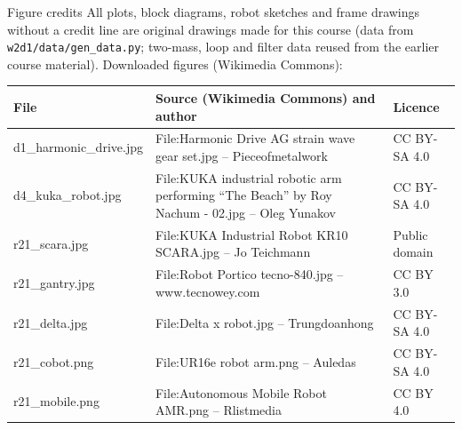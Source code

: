 \documentclass[aspectratio=169,10pt]{beamer}
\begin{document}
\begin{frame}[t]{Figure credits}
\scriptsize
All plots, block diagrams, robot sketches and frame drawings without a credit line are original drawings made for this course
(data from \texttt{w2d1/data/gen\_data.py}; two-mass, loop and filter data reused from the earlier course material). Downloaded figures (Wikimedia Commons):\\[2mm]
\begin{tabularx}{\linewidth}{@{}l X l@{}}
\toprule
\textbf{File} & \textbf{Source (Wikimedia Commons) and author} & \textbf{Licence}\\
\midrule
d1\_harmonic\_drive.jpg & File:Harmonic Drive AG strain wave gear set.jpg -- Pieceofmetalwork & CC BY-SA 4.0\\
d4\_kuka\_robot.jpg & File:KUKA industrial robotic arm performing ``The Beach'' by Roy Nachum - 02.jpg -- Oleg Yunakov & CC BY-SA 4.0\\
r21\_scara.jpg & File:KUKA Industrial Robot KR10 SCARA.jpg -- Jo Teichmann & Public domain\\
r21\_gantry.jpg & File:Robot Portico tecno-840.jpg -- www.tecnowey.com & CC BY 3.0\\
r21\_delta.jpg & File:Delta x robot.jpg -- Trungdoanhong & CC BY-SA 4.0\\
r21\_cobot.png & File:UR16e robot arm.png -- Auledas & CC BY-SA 4.0\\
r21\_mobile.png & File:Autonomous Mobile Robot AMR.png -- Rlistmedia & CC BY 4.0\\
\bottomrule
\end{tabularx}
\end{frame}
\end{document}
